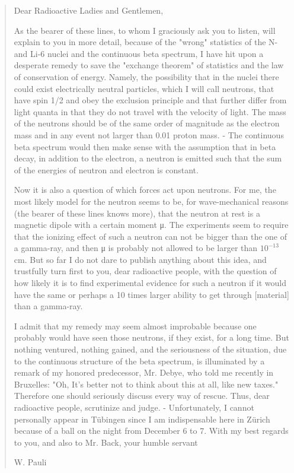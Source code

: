 \documentclass[a4paper,12pt]{book}
\begin{document}
\begin{quote}
Dear Radioactive Ladies and Gentlemen,

As the bearer of these lines, to whom I graciously ask you to listen, will explain to you in more
detail, because of the "wrong" statistics of the N- and Li-6 nuclei and the continuous beta
spectrum, I have hit upon a desperate remedy to save the "exchange theorem" of statistics and
the law of conservation of energy. Namely, the possibility that in the nuclei there could exist
electrically neutral particles, which I will call neutrons, that have spin 1/2 and obey the exclusion
principle and that further differ from light quanta in that they do not travel with the velocity of
light. The mass of the neutrons should be of the same order of magnitude as the electron mass and
in any event not larger than 0.01 proton mass. - The continuous beta spectrum would then make
sense with the assumption that in beta decay, in addition to the electron, a neutron is emitted such
that the sum of the energies of neutron and electron is constant.

Now it is also a question of which forces act upon neutrons. For me, the most likely model for the
neutron seems to be, for wave-mechanical reasons (the bearer of these lines knows more), that the
neutron at rest is a magnetic dipole with a certain moment μ. The experiments seem to require
that the ionizing effect of such a neutron can not be bigger than the one of a gamma-ray, and then
μ is probably not allowed to be larger than $10^{-13}$cm.
But so far I do not dare to publish anything about this idea, and trustfully turn first to you, dear
radioactive people, with the question of how likely it is to find experimental evidence for such a
neutron if it would have the same or perhaps a 10 times larger ability to get through [material]
than a gamma-ray.

I admit that my remedy may seem almost improbable because one probably would have seen
those neutrons, if they exist, for a long time. But nothing ventured, nothing gained, and the
seriousness of the situation, due to the continuous structure of the beta spectrum, is illuminated by
a remark of my honored predecessor, Mr. Debye, who told me recently in Bruxelles: "Oh, It's
better not to think about this at all, like new taxes." Therefore one should seriously discuss every
way of rescue. Thus, dear radioactive people, scrutinize and judge. - Unfortunately, I cannot
personally appear in T\"{u}bingen since I am indispensable here in Z\"{u}rich because of a ball on the
night from December 6 to 7. With my best regards to you, and also to Mr. Back, your humble
servant

                                                     W. Pauli

\end{quote}
\end{document}
